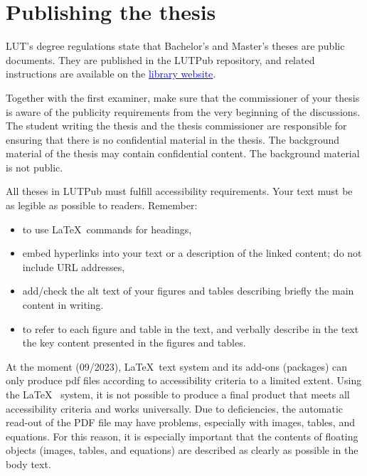 \thispagestyle{empty} %
\section{Publishing the thesis}\label{App:G}

LUT’s degree regulations state that Bachelor's and Master's theses are public documents. They are published in the LUTPub repository, and related instructions are available on the \href{https://libguides.lut.fi/lutpub-en}{\textcolor{blue}{library website}}.

Together with the first examiner, make sure that the commissioner of your thesis is aware of the publicity requirements from the very beginning of the discussions. The student writing the thesis and the thesis commissioner are responsible for ensuring that there is no confidential material in the thesis. The background material of the thesis may contain confidential content. The background material is not public.

All theses in LUTPub must fulfill accessibility requirements. Your text must be as legible as possible to readers. Remember:
\begin{itemize}
    \item to use \LaTeX~commands for headings,
    \item embed hyperlinks into your text or a description of the linked content; do not include URL addresses,
    \item add/check the alt text of your figures and tables describing briefly the main content in writing.
    \item to refer to each figure and table in the text, and verbally describe in the text the key content presented in the figures and tables.
\end{itemize}

At the moment (09/2023), \LaTeX~text system and its add-ons (packages) can only produce pdf files according to accessibility criteria to a limited extent. Using the \LaTeX~ system, it is not possible to produce a final product that meets all accessibility criteria and works universally. Due to deficiencies, the automatic read-out of the PDF file may have problems, especially with images, tables, and equations. For this reason, it is especially important that the contents of floating objects (images, tables, and equations) are described as clearly as possible in the body text.

\clearpage %